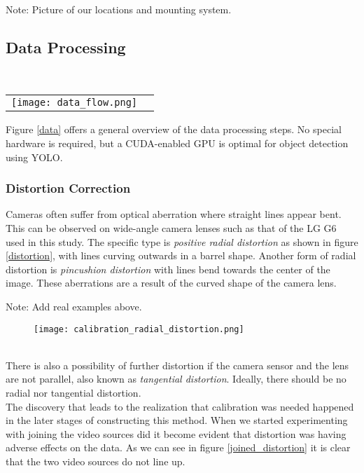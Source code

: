 Note: Picture of our locations and mounting system.

\subsection{Data Processing}

\ \\ 
\noindent
\begin{tabular}{@{}cc}
\texttt{[image: data\_flow.png]} 
\end{tabular}
\label{data}


Figure \ref{data} offers a general overview of the data processing steps. No special hardware is required, but a CUDA-enabled GPU is optimal for object detection using YOLO.
\ \\
\subsubsection{Distortion Correction}

Cameras often suffer from optical aberration where straight lines appear bent. This can be observed on wide-angle camera lenses such as that of the LG G6 used in this study.
The specific type is \textit{positive radial distortion} as shown in figure \ref{distortion}, with lines curving outwards in a barrel shape.
Another form of radial distortion is \textit{pincushion distortion} with lines bend towards the center of the image. These aberrations are a result 
of the curved shape of the camera lens.

Note: Add real examples above.
\ \\ 
\begin{figure}[h]
  \texttt{[image: calibration\_radial\_distortion.png]}
  \centering 
  \end{figure}
  \label{distortion}

\ \\

There is also a possibility of further distortion if the camera sensor and the lens are not parallel, also known as \textit{tangential distortion}.
Ideally, there should be no radial nor tangential distortion.
\ \\
The discovery that leads to the realization that calibration was needed happened in the later stages of constructing this method. When we
started experimenting with joining the video sources did it become evident that distortion was having adverse effects on the data. As we can see in figure 
\ref{joined_distortion} it is clear that the two video sources do not line up.

